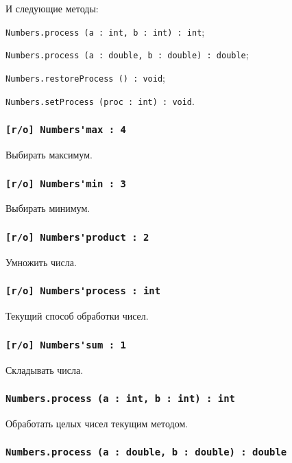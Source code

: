 И следующие методы:
\begin{icItems}
	\item \lstinline|Numbers.process (a : int, b : int) : int|;
	\item \lstinline|Numbers.process (a : double, b : double) : double|;
	\item \lstinline|Numbers.restoreProcess () : void|;
	\item \lstinline|Numbers.setProcess (proc : int) : void|.
\end{icItems}

\subsubsection{\lstinline|[r/o] Numbers'max : 4|}

Выбирать максимум.

\subsubsection{\lstinline|[r/o] Numbers'min : 3|}

Выбирать минимум.

\subsubsection{\lstinline|[r/o] Numbers'product : 2|}

Умножить числа.

\subsubsection{\lstinline|[r/o] Numbers'process : int|}

Текущий способ обработки чисел.

\subsubsection{\lstinline|[r/o] Numbers'sum : 1|}

Складывать числа.

\subsubsection{\lstinline|Numbers.process (a : int, b : int) : int|}

Обработать целых чисел текущим методом.

\subsubsection{\lstinline|Numbers.process (a : double, b : double) : double|}

